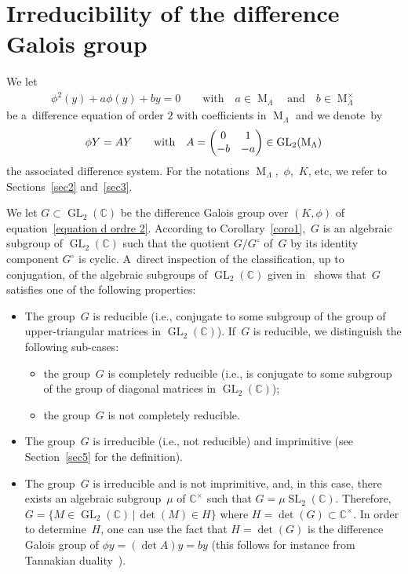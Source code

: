 \section{Irreducibility of the dif\/ference Galois group}
\label{sec4}
We let
\begin{gather}
\label{equation d ordre 2}
\phi^{2}(y) + a \phi(y)+by=0 \qquad \text{with} \quad a \in \operatorname{M}_{\Lambda} \quad \text{and} \quad b\in
\operatorname{M}_{\Lambda}^{\times}
\end{gather}
be a~dif\/ference equation of order $2$ with coef\/f\/icients in $\operatorname{M}_{\Lambda}$ and we denote~by
\begin{gather*}
\phi Y=AY \qquad \hbox{with} \quad A=
\begin{pmatrix}
0&1
\\
-b&-a
\end{pmatrix}
\in \operatorname{GL}_{2}(\operatorname{M}_{\Lambda})
\end{gather*}
the associated dif\/ference system.
For the notations $\operatorname{M}_{\Lambda}$,~$\phi$,~$K$, etc, we refer to Sections~\ref{sec2} and~\ref{sec3}.

We let $G \subset \operatorname{GL}_{2}(\mathbb C)$ be the dif\/ference Galois group over $(K,\phi)$ of
equation~\eqref{equation d ordre 2}.
According to Corollary~\ref{coro1},~$G$ is an algebraic subgroup of $\operatorname{GL}_{2}(\mathbb C)$ such that the
quotient $G/G^{\circ}$ of~$G$ by its identity component $G^{\circ}$ is cyclic.
A~direct inspection of the classif\/ication, up to conjugation, of the algebraic subgroups of
$\operatorname{GL}_{2}(\mathbb C)$ given in~\cite[Theorem~4]{NvdPT} shows that~$G$ satisf\/ies one of the following
properties:
\begin{itemize}
\itemsep=0pt
\item The group~$G$ is reducible (i.e., conjugate to some subgroup of the group of upper-triangular matrices in
$\operatorname{GL}_{2}(\mathbb C)$).
If~$G$ is reducible, we distinguish the following sub-cases:
\begin{itemize}\itemsep=0pt
\item the group~$G$ is completely reducible (i.e., is conjugate to some subgroup of the group of diagonal matrices
in $\operatorname{GL}_{2}(\mathbb C)$);
\item the group~$G$ is not completely reducible.
\end{itemize}
\item The group~$G$ is irreducible (i.e., not reducible) and imprimitive (see Section~\ref{sec5} for the def\/inition).
\item The group~$G$ is irreducible and is not imprimitive, and, in this case, there exists an algebraic subgroup~$\mu$
of $\mathbb C^{\times}$ such that $G= \mu \operatorname{SL}_{2}(\mathbb C)$.
Therefore, $G= \{M \in \operatorname{GL}_{2}(\mathbb C) \, \vert \, \det(M) \in H\}$ where $H=\det(G) \subset \mathbb
C^{\times}$.
In order to determine~$H$, one can use the fact that $H=\det(G)$ is the dif\/ference Galois group of $\phi y = (\det A) y
= by$ (this follows for instance from Tannakian duality~\cite[Section~1.4]{VdPS97}).
\end{itemize}

